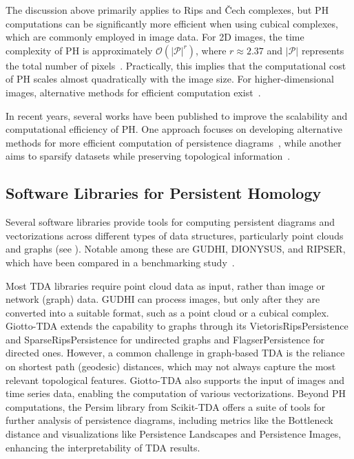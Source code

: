 The discussion above primarily applies to Rips and \v{C}ech complexes, but PH computations can be significantly more efficient when using cubical complexes, which are commonly employed in image data. For 2D images, the time complexity of PH is approximately $\mathcal{O}(|\mathcal{P}|^r)$, where $r \approx 2.37$ and $|\mathcal{P}|$ represents the total number of pixels~\cite{milosavljevic2011zigzag}. Practically, this implies that the computational cost of PH scales almost quadratically with the image size. For higher-dimensional images, alternative methods for efficient computation exist~\cite{wagner2011efficient}.


In recent years, several works have been published to improve the scalability and computational efficiency of PH. One approach focuses on developing alternative methods for more efficient computation of persistence diagrams~\cite{kannan2019persistent,guillou2023discrete}, while another aims to sparsify datasets while preserving topological information~\cite{otter2017roadmap,malott2020topology,akcora2022reduction}.

\subsection{Software Libraries for Persistent Homology} \label{sec:PH_software}


Several software libraries provide tools for computing persistent diagrams and vectorizations across different types of data structures, particularly point clouds and graphs (see ). Notable among these are GUDHI, DIONYSUS, and RIPSER, which have been compared in a benchmarking study~\cite{somasundaram2021benchmarking}.  

Most TDA libraries require point cloud data as input, rather than image or network (graph) data. GUDHI can process images, but only after they are converted into a suitable format, such as a point cloud or a cubical complex. Giotto-TDA extends the capability to graphs through its VietorisRipsPersistence and SparseRipsPersistence for undirected graphs and FlagserPersistence for directed ones. However, a common challenge in graph-based TDA is the reliance on shortest path (geodesic) distances, which may not always capture the most relevant topological features. Giotto-TDA also supports the input of images and time series data, enabling the computation of various vectorizations. Beyond PH computations, the Persim library from Scikit-TDA offers a suite of tools for further analysis of persistence diagrams, including metrics like the Bottleneck distance and visualizations like Persistence Landscapes and Persistence Images, enhancing the interpretability of TDA results.

